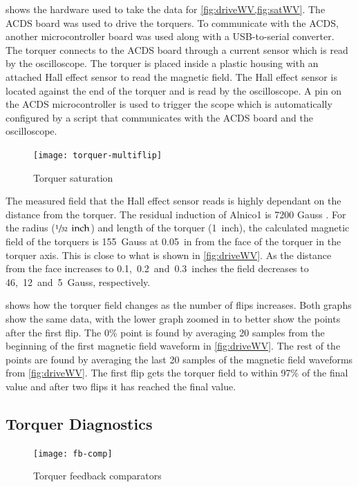  shows the hardware used to take the data for \cref{fig:driveWV,fig:satWV}. The \ac{ACDS} board was used to drive the torquers. To communicate with the \ac{ACDS}, another microcontroller board was used along with a \ac{USB}-to-serial converter. The torquer connects to the \ac{ACDS} board through a current sensor which is read by the oscilloscope. The torquer is placed inside a plastic housing with an attached Hall effect sensor to read the magnetic field. The Hall effect sensor is located against the end of the torquer and is read by the oscilloscope. A pin on the \ac{ACDS} microcontroller is  used to trigger the scope which is automatically configured by a \matlab script that communicates with the \ac{ACDS} board and the oscilloscope.

\begin{figure}[htb!]
    \centering
    \texttt{[image: torquer-multiflip]}
    \caption{Torquer saturation}
    \label{fig:satWV}
\end{figure}


The measured field that the Hall effect sensor reads is highly dependant on the distance from the torquer. The residual induction of Alnico1 is 7200 Gauss \cite{AlnicoProp}. For the radius ($\sfrac{1}{32}~\, \mathrm{inch}$) and length of the torquer (1~inch), the calculated magnetic field of the torquers is 155~Gauss at 0.05~in from the face of the torquer in the torquer axis\cite{DexterField}. This is close to what is shown in \cref{fig:driveWV}. As the distance from the face increases to 0.1,~0.2~and~0.3~inches the field decreases to 46,~12~and~5~Gauss, respectively.

 shows how the torquer field changes as the number of flips increases. Both graphs show the same data, with the lower graph zoomed in to better show the points after the first flip. The 0\% point is found by averaging 20 samples from the beginning of the first magnetic field waveform in \cref{fig:driveWV}. The rest of the points are found by averaging the last 20 samples of the magnetic field waveforms from \cref{fig:driveWV}. The first flip gets the torquer field to within 97\% of the final value and after two flips it has reached the final value. 

\subsection{Torquer Diagnostics}

\begin{figure}[htb!]
    \centering
    \texttt{[image: fb-comp]}
    \caption{Torquer feedback comparators}
    \label{fig:fb-comp}
\end{figure}


